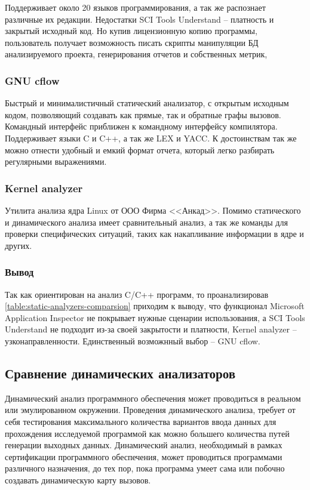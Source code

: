 Поддерживает около 20 языков программирования, а так же распознает различные их редакции.
Недостатки SCI Tools Understand -- платность и закрытый исходный код. Но купив лицензионную копию
программы, пользователь получает возможность писать скрипты манипуляции БД анализируемого проекта, 
генерирования отчетов и собственных метрик, 

\subsubsection{GNU cflow}\label{sec:ch1/sec3/sub1/sub3}
Быстрый и минималистичный статический анализатор, с открытым исходным кодом,
позволяющий создавать как прямые, так и обратные графы вызовов. 
Командный интерфейс приближен к командному интерфейсу компилятора.
Поддерживает языки C и C++, а так же LEX и YACC.
К достоинствам так же можно отнести удобный и емкий формат отчета, который легко
разбирать регулярными выражениями.

\subsubsection{Kernel analyzer}\label{sec:ch1/sec3/sub1/sub3}
Утилита анализа ядра Linux от ООО Фирма <<Анкад>>. Помимо статического и динамического
анализа имеет сравнительный анализ, а так же команды для проверки специфических ситуаций,
таких как накапливание информации в ядре и других.

\subsubsection{Вывод}\label{sec:ch1/sec3/sub1/sub4}
Так как {\ProgModule} ориентирован на анализ C/C++ программ, то проанализировав
\autoref{table:static-analyzers-comparsion} приходим к выводу, что функционал 
Microsoft Application Inspector не покрывает нужные сценарии использования, 
а SCI Tools Understand не подходит из-за своей закрытости и платности, Kernel analyzer -- узконаправленности.
Единственный возможнный выбор -- GNU cflow. 

\subsection{Сравнение динамических анализаторов}\label{sec:ch1/sec3/sub2}
Динамический анализ программного обеспечения может проводиться в реальном
или эмулированном окружении. Проведения динамического
анализа, требует от себя тестирования максимального количества вариантов
ввода данных для прохождения исследуемой программой как можно большего количества путей генерации 
выходных данных.
Динамический анализ, необходимый в рамках сертификации программного обеспечения, может проводиться
программами различного назначения, до тех пор, пока программа умеет сама или побочно
создавать динамическую карту вызовов.

